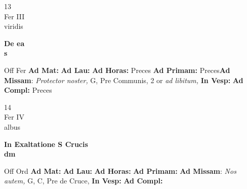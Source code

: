\documentclass[10pt, openany]{book}
\begin{document}
    \begin{center}
        \begin{minipage}{3.5in}
            \vspace{2em}
            \begin{minipage}{0.5in}
                {\Huge 13} \\
                {\normalsize Fer III} \\
                {\normalsize viridis}
            \end{minipage}
            \begin{minipage}{3.0in}
                \textbf{ \large De ea \\
                \textnormal{\normalsize s}} \\ 
            \end{minipage}
            \begin{justify}Off Fer
                \textbf{Ad Mat: }
                \textbf{Ad Lau: }
                \textbf{Ad Horas: }Preces
                \textbf{Ad Primam: }Preces\textbf{Ad Missam}: \textit{Protector noster,} G, Pre Communis, 2 or \textit{ad libitum,}  
                \textbf{In Vesp: }
                \textbf{Ad Compl: }Preces
            \end{justify}
        \end{minipage}
    \end{center}

    \begin{center}
        \begin{minipage}{3.5in}
            \vspace{2em}
            \begin{minipage}{0.5in}
                {\Huge 14} \\
                {\normalsize Fer IV} \\
                {\normalsize albus}
            \end{minipage}
            \begin{minipage}{3.0in}
                \textbf{ \large In Exaltatione S Crucis \\
                \textnormal{\normalsize dm}} \\ 
            \end{minipage}
            \begin{justify}Off Ord
                \textbf{Ad Mat: }
                \textbf{Ad Lau: }
                \textbf{Ad Horas: }
                \textbf{Ad Primam: }\textbf{Ad Missam}: \textit{Nos autem,} G, C, Pre de Cruce,  
                \textbf{In Vesp: }
                \textbf{Ad Compl: }
            \end{justify}
        \end{minipage}
    \end{center}
\end{document}
